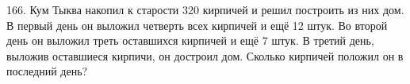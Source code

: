 166. Кум Тыква накопил к старости 320 кирпичей и решил построить из них дом. В первый день он выложил четверть всех кирпичей и ещё 12 штук. Во второй день он выложил треть оставшихся кирпичей и ещё 7 штук. В третий день, выложив оставшиеся кирпичи, он достроил дом. Сколько кирпичей положил он в последний день?\\
